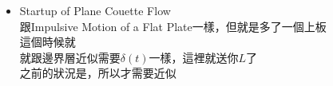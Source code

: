 \documentclass[../main.tex]{subfiles}
\begin{document}
\begin{itemize}
\begin{enumerate}
\begin{equation}
      u_x(y,t) = \text{Re}\left\{
        U e^{-(1+i)\sqrt{\frac{\omega}{2\nu}}y} \cdot e^{i\omega t}
      \right\}
    \end{equation}
    利用$e^{i\theta} = \cos\theta + i\sin\theta$展開:
    \begin{align}
      u_x(y,t) &= \text{Re}\left\{
        U e^{-\sqrt{\frac{\omega}{2\nu}}y} \left[
          \cos\left(\omega t - \sqrt{\frac{\omega}{2\nu}}y\right) + i \sin\left(\omega t - \sqrt{\frac{\omega}{2\nu}}y\right)
        \right]
      \right\} \nonumber\\
      &= U e^{-\sqrt{\frac{\omega}{2\nu}}y} \cos\left(\omega t - \sqrt{\frac{\omega}{2\nu}}y\right)
    \end{align}
    \item 物理分析:
    \begin{itemize}
      \item 漸近線為:
      \begin{equation}
        u_x(y) = U e^{-\sqrt{\frac{\omega}{2\nu}}y}
      \end{equation}
      \item Phase Shift:
      \begin{equation}
        \text{Phase Shift} = \sqrt{\frac{\omega}{2\nu}} y
      \end{equation}
      \item 邊界層:\\
      假設令$u_x(\delta, t) = 0.01 U$，則:
      \begin{align}
        & 0.01 U = U e^{-\sqrt{\frac{\omega}{2\nu}}\delta} \nonumber\\
        & \delta = \sqrt{\frac{2\nu}{\omega}} \ln(100) \approx 4.605 \sqrt{\frac{2\nu}{\omega}} 
        \approx 6.51 \sqrt{\frac{\nu}{\omega}}
      \end{align}
    \end{itemize}
  \end{enumerate}
  \item Startup of Plane Couette Flow\\
  跟Impulsive Motion of a Flat Plate一樣，但就是多了一個上板\\
  這個時候就\\
  就跟邊界層近似需要$\delta(t)$一樣，這裡就送你$L$了\\
  之前的狀況是，所以才需要近似
  \begin{figure}[H]
    \centering
    \begin{tikzpicture}[>=Latex, line cap=round, line join=round, thick]

\end{tikzpicture}
\end{figure}
\end{itemize}
\end{document}
